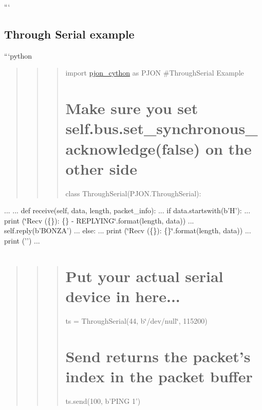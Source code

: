 ```

\subsection*{Through Serial example}

```python \begin{quotation}
\begin{quotation}
\begin{quotation}
import \hyperlink{namespacepjon__cython}{pjon\-\_\-cython} as P\-J\-O\-N \#\-Through\-Serial Example \section*{Make sure you set self.\-bus.\-set\-\_\-synchronous\-\_\-acknowledge(false) on the other side}



class Through\-Serial(P\-J\-O\-N.\-Through\-Serial)\-:

\end{quotation}


\end{quotation}


\end{quotation}
... ... def receive(self, data, length, packet\-\_\-info)\-: ... if data.\-startswith(b'H')\-: ... print (\char`\"{}\-Recv (\{\})\-: \{\} -\/ R\-E\-P\-L\-Y\-I\-N\-G\char`\"{}.format(length, data)) ... self.\-reply(b'B\-O\-N\-Z\-A') ... else\-: ... print (\char`\"{}\-Recv (\{\})\-: \{\}\char`\"{}.format(length, data)) ... print ('') ... \begin{quotation}
\begin{quotation}
\begin{quotation}
\section*{Put your actual serial device in here...}

ts = Through\-Serial(44, b\char`\"{}/dev/null\char`\"{}, 115200) \section*{Send returns the packet's index in the packet buffer}

ts.\-send(100, b'P\-I\-N\-G 1')

\end{quotation}


\end{quotation}


\end{quotation}
